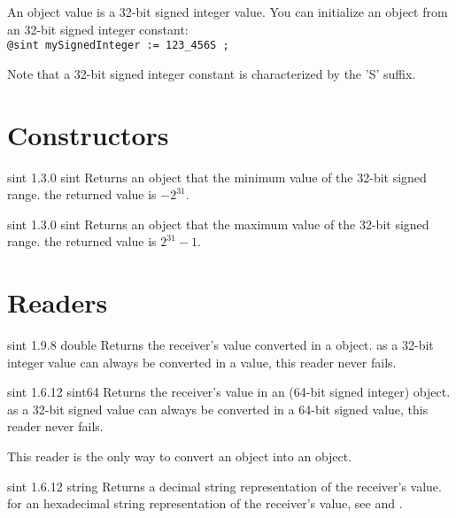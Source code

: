 

An  object value is a 32-bit signed integer value. You can initialize an  object from an 32-bit signed integer constant:\\

\texttt{@sint mySignedInteger := 123\_456S ;}

Note that a 32-bit signed integer constant is characterized by the 'S' suffix.


\section{Constructors}

{sint}
{1.3.0}
{sint}
{Returns an  object that the minimum value of the 32-bit signed range.}
{the returned value is $-2^{31}$.}





{sint}
{1.3.0}
{sint}
{Returns an  object that the maximum value of the 32-bit signed range.}
{the returned value is $2^{31}-1$.}



\section{Readers}

{sint}
{1.9.8}
{double}
{Returns the receiver's value converted in a  object.}
{as a 32-bit integer value can always be converted in a  value, this reader never fails.}





{sint}
{1.6.12}
{sint64}
{Returns the receiver's value in an  (64-bit signed integer) object.}
{as a 32-bit signed value can always be converted in a 64-bit signed value, this reader never fails.}

This reader is the only way to convert an  object into an  object.





{sint}
{1.6.12}
{string}
{Returns a decimal string representation of the receiver's value.}
{for an hexadecimal string representation of the receiver's value, see  and .}







